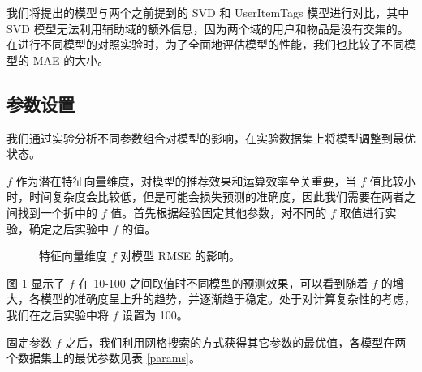 我们将提出的模型与两个之前提到的 SVD 和 UserItemTags 模型进行对比，其中 SVD 模型无法利用辅助域的额外信息，因为两个域的用户和物品是没有交集的。在进行不同模型的对照实验时，为了全面地评估模型的性能，我们也比较了不同模型的 MAE 的大小。

\subsection{参数设置}
我们通过实验分析不同参数组合对模型的影响，在实验数据集上将模型调整到最优状态。

$f$ 作为潜在特征向量维度，对模型的推荐效果和运算效率至关重要，当 $f$ 值比较小时，时间复杂度会比较低，但是可能会损失预测的准确度，因此我们需要在两者之间找到一个折中的 $f$ 值。首先根据经验固定其他参数，对不同的 $f$ 取值进行实验，确定之后实验中 $f$ 的值。
\begin{figure}[htbp]
\centering
{}
\caption{特征向量维度 $f$ 对模型 RMSE 的影响。}
\label{fig:nfactors}
\end{figure}
图 \ref{fig:nfactors} 显示了 $f$ 在 10-100 之间取值时不同模型的预测效果，可以看到随着 $f$ 的增大，各模型的准确度呈上升的趋势，并逐渐趋于稳定。处于对计算复杂性的考虑，我们在之后实验中将 $f$ 设置为 100。

固定参数 $f$ 之后，我们利用网格搜索的方式获得其它参数的最优值，各模型在两个数据集上的最优参数见表 \ref{params}。

